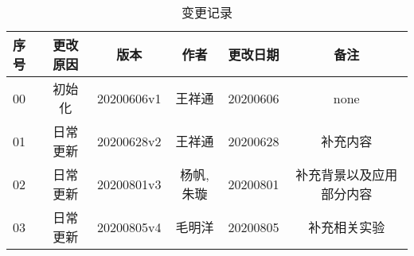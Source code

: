 \newpage
\begin{table}
	\begin{center}
		\caption{变更记录}
		\begin{tabular}{l|ccccc}
			\toprule[2pt] 
			序号   &  更改原因 & 版本&作者&更改日期&备注 \\ \hline
			00& 初始化&20200606v1&王祥通&20200606& none\\
			01&日常更新&20200628v2&王祥通&20200628&补充内容\\
			02&日常更新&20200801v3&杨帆,朱璇&20200801&补充背景以及应用部分内容\\
			03&日常更新&20200805v4&毛明洋&20200805&补充相关实验\\

			\toprule[2pt] 
		\end{tabular}
		
		\label{tab:log}
		\vspace{-0.4cm}
	\end{center}
\end{table}